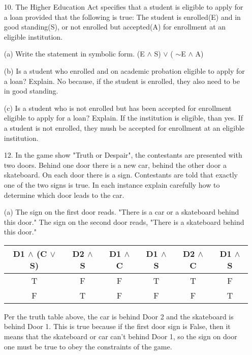 \documentclass{article}
\begin{document}
\begin{itemize}
    (d) (A $\vee \sim$C) $\wedge$ D {\color{blue} It is snowing or the streets are slick, and the trees are green.}
    
    (e) $\sim$ (A $\wedge \sim$D) {\color{blue} It is not the case that, it is snowing and the trees are not green.}
    
    (f) $\sim$ (A $\wedge \sim$C) {\color{blue} It is not the case that, it is snowing and the streets are slick.}
    
    \item[10.] The Higher Education Act specifies that a student is eligible to apply for a loan provided that the following is true: The student is enrolled(E) and in good standing(S), or not enrolled but accepted(A) for enrollment at an eligible institution.  
    
    (a) Write the statement in symbolic form. {\color{blue} (E $\wedge$ S) $\vee$ ( $\sim$E $\wedge$ A)}
    
    (b) Is a student who enrolled and on academic probation eligible to apply for a loan? Explain.
    {\color{blue} No because, if the student is enrolled, they also need to be in good standing.}
    
    (c) Is a student who is not enrolled but has been accepted for enrollment eligible to apply for a loan? Explain.  {\color{blue} If the institution is eligible, than yes.  If a student is not enrolled, they mush be accepted for enrollment at an eligible institution.}
    
    \item[12.] In the game show "Truth or Despair", the contestants are presented with two doors.  Behind one door there is a new car, behind the other door a skateboard.  On each door there is a sign.  Contestants are told that exactly one of the two signs is true.   In each instance explain carefully how to determine which door leads to the car.
    
    (a) The sign on the first door reads. "There is a car or a skateboard behind this door." The sign on the second door reads, "There is a skateboard behind this door." 
    \begin{center}
        \begin{tabular}{|c|c||c|c|c|c|}
            \hline
            D1 $\wedge$ (C $\vee$ S) & D2 $\wedge$ S & D1 $\wedge$ C & D1 $\wedge$ S & D2 $\wedge$ C & D1 $\wedge$ S\\
            \hline
            \rowcolor{LightCyan}
            T & F & F & T & T & F\\
            \hline
            \rowcolor{LightRed}
            F & T & F & F & F & T\\
            \hline
        \end{tabular}
    \end{center}
    {\color{blue}Per the truth table above, the car is behind Door 2 and the skateboard is behind Door 1.  This is true because if the first door sign is False, then it means that the skateboard or car can't behind Door 1, so the sign on door one must be true to obey the constraints of the game.}
    

\end{itemize}
\end{document}
